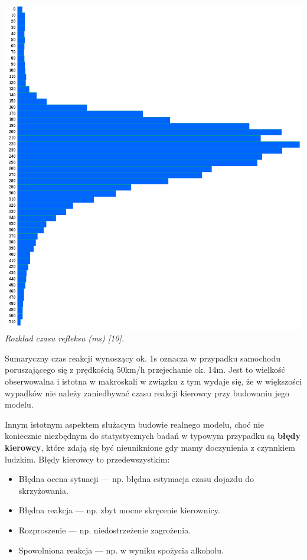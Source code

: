 {{{\begin{center}
\includegraphics[width=\textwidth,keepaspectratio]{img/reaction_times}
\textit{Rozkład czasu refleksu (ms) [10].}
\end{center}
}
\par{
Sumaryczny czas reakcji wynoszący ok. 1s oznacza w przypadku samochodu poruszającego się z prędkością 50km/h przejechanie ok. 14m. Jest to wielkość obserwowalna i istotna w makroskali w związku z tym wydaje się, że w większości wypadków nie należy zaniedbywać czasu reakcji kierowcy przy budowaniu jego modelu.
}
\par{
Innym istotnym aspektem służacym budowie realnego modelu, choć nie koniecznie niezbędnym do statystycznych badań w typowym przypadku są \textbf{błędy kierowcy}, które zdają się być nieuniknione gdy mamy doczynienia z czynnkiem ludzkim. Błędy kierowcy to przedewszystkim:
\begin{itemize}
\item Błędna ocena sytuacji --- np. błędna estymacja czasu dojazdu do skrzyżowania.
\item Błędna reakcja --- np. zbyt mocne skręcenie kierownicy.
\item Rozproszenie --- np. niedostrzeżenie zagrożenia.
\item Spowolniona reakcja --- np. w wyniku spożycia alkoholu.

\end{itemize}}}}
